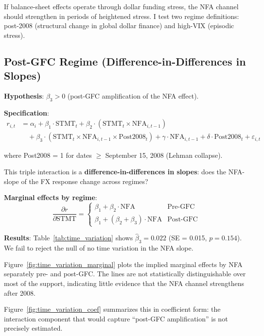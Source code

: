 \documentclass[12pt]{article}
\begin{document}
If balance-sheet effects operate through dollar funding stress, the NFA channel should strengthen in periods of heightened stress. I test two regime definitions: post-2008 (structural change in global dollar finance) and high-VIX (episodic stress).

\subsection{Post-GFC Regime (Difference-in-Differences in Slopes)}

\textbf{Hypothesis}: $\beta_3 > 0$ (post-GFC amplification of the NFA effect).

\textbf{Specification}:
\begin{align}
r_{i,t} &= \alpha_i + \beta_1 \cdot \text{STMT}_t + \beta_2 \cdot (\text{STMT}_t \times \text{NFA}_{i,t-1}) \nonumber \\
&\quad + \beta_3 \cdot (\text{STMT}_t \times \text{NFA}_{i,t-1} \times \text{Post2008}_t) + \gamma \cdot \text{NFA}_{i,t-1} + \delta \cdot \text{Post2008}_t + \varepsilon_{i,t}
\end{align}

where Post2008 = 1 for dates $\geq$ September 15, 2008 (Lehman collapse).

This triple interaction is a \textbf{difference-in-differences in slopes}: does the NFA-slope of the FX response change across regimes?

\textbf{Marginal effects by regime}:
\begin{equation}
\frac{\partial r}{\partial \text{STMT}} = \begin{cases}
\beta_1 + \beta_2 \cdot \text{NFA} & \text{Pre-GFC} \\
\beta_1 + (\beta_2 + \beta_3) \cdot \text{NFA} & \text{Post-GFC}
\end{cases}
\end{equation}

\textbf{Results}: Table~\ref{tab:time_variation} shows $\hat{\beta}_3 = 0.022$ (SE = 0.015, $p = 0.154$). We fail to reject the null of no time variation in the NFA slope.

Figure~\ref{fig:time_variation_marginal} plots the implied marginal effects by NFA separately pre- and post-GFC. The lines are not statistically distinguishable over most of the support, indicating little evidence that the NFA channel strengthens after 2008.

Figure~\ref{fig:time_variation_coef} summarizes this in coefficient form: the interaction component that would capture ``post-GFC amplification'' is not precisely estimated.
\end{document}
